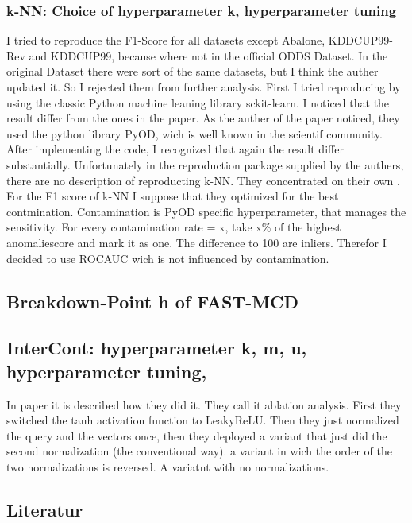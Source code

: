 \subsubsection{k-NN: Choice of hyperparameter k, hyperparameter tuning}
I tried to reproduce the F1-Score for all datasets except Abalone, KDDCUP99-Rev and KDDCUP99, because where not in the official ODDS Dataset. 
In the original Dataset there were sort of the same datasets, but I think the auther updated it. So I rejected them from further analysis. 
First I tried reproducing by using the classic Python machine leaning library sckit-learn. 
I noticed that the result differ from the ones in the paper.
As the auther of the paper noticed, they used the python library PyOD, wich is well known in the scientif community.
After implementing the code, I recognized that again the result differ substantially. 
Unfortunately in the reproduction package supplied by the authers, there are no description of reproducting k-NN.
They concentrated on their own .
For the F1 score of k-NN I suppose that they optimized for the best contmination.
Contamination is PyOD specific hyperparameter, that manages the sensitivity.
For every contamination rate = x, take x\% of the highest anomaliescore and mark it as one.
The difference to 100 are inliers.
Therefor I decided to use  ROCAUC wich is not influenced by contamination. 

\subsection{Breakdown-Point h of FAST-MCD}
\subsection{InterCont: hyperparameter k, m, u, hyperparameter tuning,}
In paper it is described how they did it. They call it ablation analysis.
First they switched the tanh activation function to LeakyReLU.
Then they just normalized the query and the vectors once, then they deployed a variant that just did the second normalization (the conventional way).
a variant in wich the order of the two normalizations is reversed. 
A variatnt with no normalizations. 


\subsection{Literatur}
\citep[p.5]{hilal2022financial}


